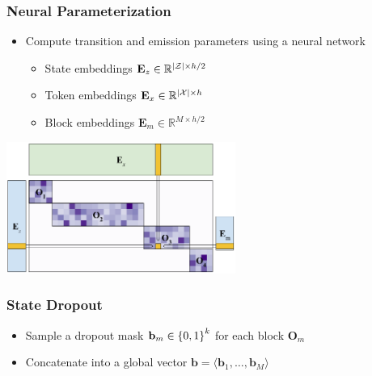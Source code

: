 \documentclass{beamer}
\begin{document}
\begin{frame}
\frametitle{Neural Parameterization}

\begin{itemize}
\item Compute transition and emission parameters using a neural network
\begin{itemize}
\item State embeddings $\mathbf{E}_z \in \mathbb{R}^{|\mathcal{Z}| \times h/2}$
\item Token embeddings $\mathbf{E}_x \in \mathbb{R}^{|\mathcal{X}| \times h}$
\item Block embeddings $\mathbf{E}_m \in \mathbb{R}^{M \times h/2}$
\end{itemize}
\end{itemize}

\vspace{0.5em}

\centering
\includegraphics[height=1.7in]{img/mat.png}

\end{frame}


\begin{frame}
\frametitle{State Dropout}
\begin{itemize}
\item Sample a dropout mask $\mathbf{b}_m \in \left\{0,1\right\}^k$ for each block $\mathbf{O}_m$
\item Concatenate into a global vector $\mathbf{b} = \langle \mathbf{b}_1, \ldots, \mathbf{b}_M \rangle$
\end{itemize}

\vspace{1em}
\centering
\resizebox{2in}{2in}{

}
\end{frame}
\end{document}
